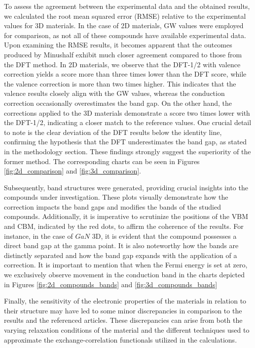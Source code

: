 To assess the agreement between the experimental data and the obtained results, we calculated the root mean squared error (RMSE) relative to the experimental values for 3D materials. In the case of 2D materials, GW values were employed for comparison, as not all of these compounds have available experimental data. Upon examining the RMSE results, it becomes apparent that the outcomes produced by Minushalf exhibit much closer agreement compared to those from the DFT method. In 2D materials, we observe that the DFT-1/2 with valence correction yields a score more than three times lower than the DFT score, while the valence correction is more than two times higher. This indicates that the valence results closely align with the GW values, whereas the conduction correction occasionally overestimates the band gap. On the other hand, the corrections applied to the 3D materials demonstrate a score two times lower with the DFT-1/2, indicating a closer match to the reference values. One crucial detail to note is the clear deviation of the DFT results below the identity line, confirming the hypothesis that the DFT underestimates the band gap, as stated in the methodology section. These findings strongly suggest the superiority of the former method. The corresponding charts can be seen in Figures \ref{fig:2d_comparison} and \ref{fig:3d_comparison}.

Subsequently, band structures were generated, providing crucial insights into the compounds under investigation. These plots visually demonstrate how the correction impacts the band gaps and modifies the bands of the studied compounds. Additionally, it is imperative to scrutinize the positions of the VBM and CBM, indicated by the red dots, to affirm the coherence of the results. For instance, in the case of $GaN$ 3D, it is evident that the compound possesses a direct band gap at the gamma point. It is also noteworthy how the bands are distinctly separated and how the band gap expands with the application of a correction. It is important to mention that when the Fermi energy is set at zero, we exclusively observe movement in the conduction band in the charts depicted in Figures \ref{fig:2d_compounds_bands} and \ref{fig:3d_compounds_bands}

Finally, the sensitivity of the electronic properties of the materials in relation to their structure may have led to some minor discrepancies in comparison to the results and the referenced articles. These discrepancies can arise from both the varying relaxation conditions of the material and the different techniques used to approximate the exchange-correlation functionals utilized in the calculations.

